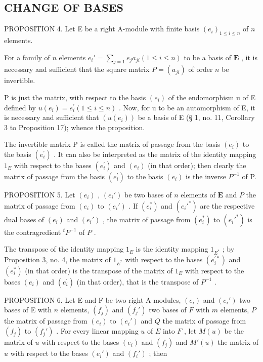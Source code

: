 \subsection{CHANGE OF BASES}

PROPOSITION 4. Let E be a right A-module with finite basis \((e_i)_{1 \leqslant i \leqslant n}\) of \(n\) elements.

For a family of \(n\) elements \(e_i' = \sum_{j=1} e_j a_{ji} (1 \leqslant i \leqslant n)\) to be a basis of \(\mathbf{E}\) , it is necessary and sufficient that the square matrix \(P = (a_{ji})\) of order \(n\) be invertible.

P is just the matrix, with respect to the basis \((e_{i})\) of the endomorphism u of E defined by \(u(e_{i}) = e_{i}^{\prime} (1 \leqslant i \leqslant n)\) . Now, for u to be an automorphism of E, it is necessary and sufficient that \((u(e_{i}))\) be a basis of E (§ 1, no. 11, Corollary 3 to Proposition 17); whence the proposition.

The invertible matrix P is called the matrix of passage from the basis \((e_{i})\) to the basis \((e_{i}^{\prime})\) . It can also be interpreted as the matrix of the identity mapping \(1_{E}\) with respect to the bases \((e_{i}^{\prime})\) and \((e_{i})\) (in that order); then clearly the matrix of passage from the basis \((e_{i}^{\prime})\) to the basis \((e_{i})\) is the inverse \(P^{-1}\) of P.

PROPOSITION 5. Let \((e_i)\) , \((e_i')\) be two bases of \(n\) elements of \(\mathbf{E}\) and \(P\) the matrix of passage from \((e_i)\) to \((e_i')\) . If \((e_i^*)\) and \((e_i'^*)\) are the respective dual bases of \((e_i)\) and \((e_i')\) , the matrix of passage from \((e_i^*)\) to \((e_i'^*)\) is the contragredient \(^t P^{-1}\) of \(P\) .

The transpose of the identity mapping \(1_{E}\) is the identity mapping \(1_{E^{*}}\) ; by Proposition 3, no. 4, the matrix of \(1_{E^{*}}\) with respect to the bases \((e_{i}^{\prime*})\) and \((e_{i}^{*})\) (in that order) is the transpose of the matrix of \(1_{E}\) with respect to the bases \((e_{i})\) and \((e_{i}^{\prime})\) (in that order), that is the transpose of \(P^{-1}\) .

PROPOSITION 6. Let E and F be two right A-modules, \((e_i)\) and \((e_i')\) two bases of E with \(n\) elements, \((f_j)\) and \((f_j')\) two bases of \(F\) with \(m\) elements, \(P\) the matrix of passage from \((e_i)\) to \((e_i')\) and \(Q\) the matrix of passage from \((f_j)\) to \((f_j')\) . For every linear mapping \(u\) of \(E\) into \(F\) , let \(M(u)\) be the matrix of \(u\) with respect to the bases \((e_i)\) and \((f_j)\) and \(M'(u)\) the matrix of \(u\) with respect to the bases \((e_i')\) and \((f_i')\) ; then

